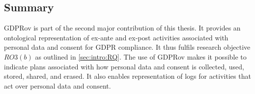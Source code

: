 



\subsection*{Summary}
GDPRov is part of the second major contribution of this thesis. It provides an ontological representation of ex-ante and ex-post activities associated with personal data and consent for GDPR compliance.
It thus fulfils research objective $RO3(b)$ as outlined in \autoref{sec:intro:RQ}. 
The use of GDPRov makes it possible to indicate plans associated with how personal data and consent is collected, used, stored, shared, and erased.
It also enables representation of logs for activities that act over personal data and consent.

